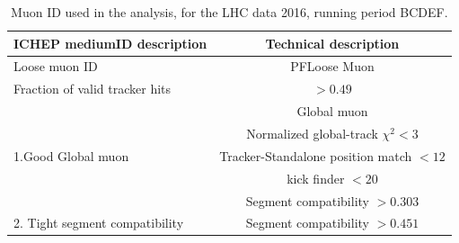 \begin{table}[!tpb]
\caption{Muon ID used in the analysis, for the LHC data 2016, running period BCDEF.  \label{tbl:ICHEPMedID}}
\label{tab:antil}
\begin{center}
\begin{tabular}{|l|c|}   
\hline
ICHEP mediumID description                    &  Technical description\\\hline
Loose muon ID                               & PFLoose Muon\\\hline
Fraction of valid tracker hits           & $>0.49$ \\\hline
\multirow{5}{*}{1.Good Global muon}                      &Global muon\\\cline{2-2}
                                                                        &Normalized global-track $\chi^{2}<3$\\\cline{2-2}
                                                                        &Tracker-Standalone position match $< 12$\\\cline{2-2}
                                                                        &kick finder $< 20$ \\\cline{2-2}
                                                                        &Segment compatibility $> 0.303$ \\\hline                                                                       
\hline
2. Tight segment compatibility      & Segment compatibility $>0.451$\\\hline
\end{tabular}
\end{center}
\end{table}



